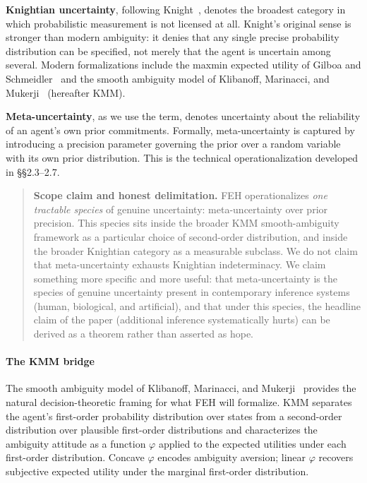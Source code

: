 \documentclass{article}
\begin{document}
\textbf{Knightian uncertainty}, following Knight~\cite{knight1921}, denotes the
broadest category in which probabilistic measurement is not licensed at
all. Knight's original sense is stronger than modern ambiguity: it
denies that any single precise probability distribution can be
specified, not merely that the agent is uncertain among several. Modern
formalizations include the maxmin expected utility of Gilboa and Schmeidler~\cite{gilboa1989} and the smooth ambiguity model of Klibanoff, Marinacci, and Mukerji~\cite{klibanoff2005} (hereafter KMM).

\textbf{Meta-uncertainty}, as we use the term, denotes uncertainty about
the reliability of an agent's own prior commitments. Formally,
meta-uncertainty is captured by introducing a precision parameter
governing the prior over a random variable with its own prior
distribution. This is the technical operationalization developed in
\S{}\S{}2.3--2.7.

\begin{quote}
\textbf{Scope claim and honest delimitation.} FEH operationalizes
\emph{one tractable species} of genuine uncertainty: meta-uncertainty
over prior precision. This species sits inside the broader KMM
smooth-ambiguity framework as a particular choice of second-order
distribution, and inside the broader Knightian category as a measurable
subclass. We do not claim that meta-uncertainty exhausts Knightian
indeterminacy. We claim something more specific and more useful: that
meta-uncertainty is the species of genuine uncertainty present in
contemporary inference systems (human, biological, and artificial), and
that under this species, the headline claim of the paper (additional
inference systematically hurts) can be derived as a theorem rather than
asserted as hope.
\end{quote}

\paragraph{The KMM bridge}\label{the-kmm-bridge}

The smooth ambiguity model of Klibanoff, Marinacci, and Mukerji~\cite{klibanoff2005}
provides the natural decision-theoretic framing for what FEH will
formalize. KMM separates the agent's first-order probability
distribution over states from a second-order distribution over plausible
first-order distributions and characterizes the ambiguity attitude as a
function \ensuremath{\varphi} applied to the expected utilities under each first-order
distribution. Concave \ensuremath{\varphi} encodes ambiguity aversion; linear \ensuremath{\varphi} recovers
subjective expected utility under the marginal first-order distribution.
\end{document}
